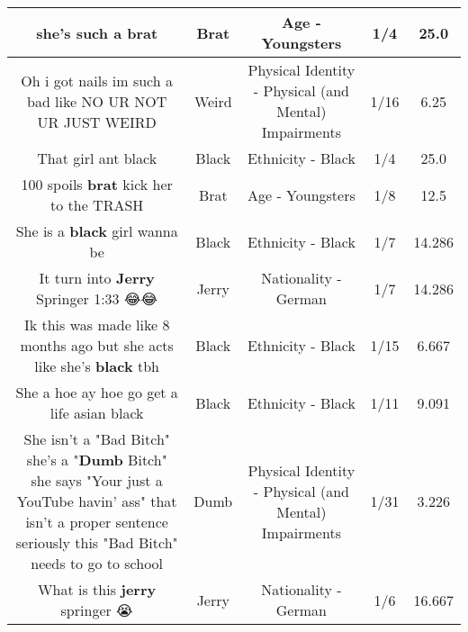 \documentclass[11pt]{article}
\newlength\mylength
\begin{document}
\begin{center}
\begin{longtable}{|C{.65\mylength}|C{.30\mylength}|C{.12\mylength}|C{.12\mylength}|C{.12\mylength}|}
  \small she's such a brat\normalsize   & Brat & Age - Youngsters & 1/4 & 25.0 \\  \hline
  \small Oh i got nails im such a bad like NO UR NOT UR JUST WEIRD\normalsize   & Weird & Physical Identity - Physical (and Mental) Impairments & 1/16 & 6.25 \\  \hline
  \small That girl ant black\normalsize   & Black & Ethnicity - Black & 1/4 & 25.0 \\  \hline
  \small 100 spoils \textbf{brat} kick her to the TRASH\normalsize   & Brat & Age - Youngsters & 1/8 & 12.5 \\  \hline
  \small She is a \textbf{black} girl wanna be\normalsize   & Black & Ethnicity - Black & 1/7 & 14.286 \\  \hline
  \small It turn into \textbf{Jerry} Springer 1:33 😂😂\normalsize   & Jerry & Nationality - German & 1/7 & 14.286 \\  \hline
  \small Ik this was made like 8 months ago but she acts like she's \textbf{black} tbh\normalsize   & Black & Ethnicity - Black & 1/15 & 6.667 \\  \hline
  \small She a hoe ay hoe go get a life asian black\normalsize   & Black & Ethnicity - Black & 1/11 & 9.091 \\  \hline
  \small She isn't a "Bad Bitch" she's a "\textbf{Dumb} Bitch" she says "Your just a YouTube havin' ass" that isn't a proper sentence seriously this "Bad Bitch" needs to go to school\normalsize   & Dumb & Physical Identity - Physical (and Mental) Impairments & 1/31 & 3.226 \\  \hline
  \small What is this \textbf{jerry} springer 😭\normalsize   & Jerry & Nationality - German & 1/6 & 16.667 \\  \hline

\end{longtable}
\end{center}
\end{document}
